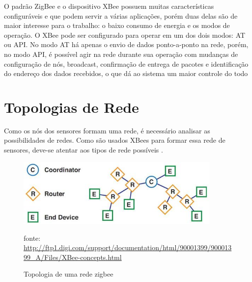  O padrão ZigBee e o dispositivo XBee possuem muitas características configuráveis e que podem servir a várias aplicações\cite{xbee_book}, porém duas delas são de maior interesse para o trabalho: o baixo consumo de energia e os modos de operação. O XBee pode ser configurado para operar em um dos dois modos: AT ou API. No modo AT há apenas o envio de dados ponto-a-ponto na rede, porém, no modo API, é possível agir na rede durante sua operação com mudanças de configuração de nós, broadcast, confirmação de entrega de pacotes e identificação do endereço dos dados recebidos, o que dá ao sistema um maior controle do todo \cite{xbee_documentation}
 
 
\section{Topologias de Rede}
\label{Sec:Redes_topologias}
 Como os nós dos sensores formam uma rede, é necessário analisar as possibilidades de redes.  Como são usados XBees para formar essa rede de sensores, deve-se atentar aos tipos de rede possíveis \cite{xbee_book} \cite{xbee_documentation}.
 
\begin{figure}[H]
\centering
\includegraphics[width=10cm,keepaspectratio]{figuras/zigbee_network_topology.jpg}
\caption{\label{fig:zigbee_network} Topologia de uma rede zigbee}
fonte: \url{http://ftp1.digi.com/support/documentation/html/90001399/90001399_A/Files/XBee-concepts.html}
\end{figure}
 
